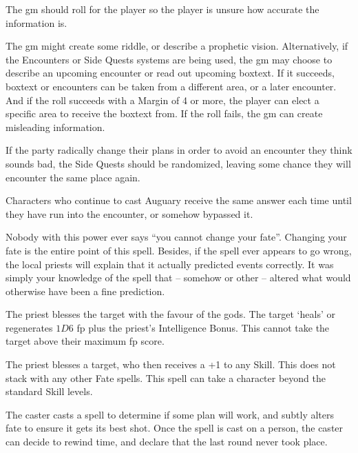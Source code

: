 \begin{multicols}{2}
The \gls{gm} should roll for the player so the player is unsure how accurate the information is.

The \gls{gm} might create some riddle, or describe a prophetic vision.
Alternatively, if the Encounters or Side Quests systems are being used, the \gls{gm} may choose to describe an upcoming encounter or read out upcoming boxtext.\iftoggle{verbose}{\footnote{See page \pageref{encounters}.}}{}
If it succeeds, boxtext or encounters can be taken from a different area, or a later encounter.
And if the roll succeeds with a Margin of 4 or more, the player can elect a specific area to receive the boxtext from.
If the roll fails, the \gls{gm} can create misleading information.

If the party radically change their plans in order to avoid an encounter they think sounds bad, the Side Quests should be randomized, leaving some chance they will encounter the same place again.

Characters who continue to cast Auguary receive the same answer each time until they have run into the encounter, or somehow bypassed it.

Nobody with this power ever says ``you cannot change your fate''.  Changing your fate is the entire point of this spell.  Besides, if the spell ever appears to go wrong, the local priests will explain that it actually predicted events correctly.  It was simply your knowledge of the spell that -- somehow or other -- altered what would otherwise have been a fine prediction.


The priest blesses the target with the favour of the gods. The target `heals' or regenerates $1D6$ \gls{fp} plus the priest's Intelligence Bonus. This cannot take the target above their maximum \gls{fp} score.

\spelllevel


The priest blesses a target, who then receives a +1 to any Skill.
This does not stack with any other Fate spells.
This spell can take a character beyond the standard Skill levels.


The caster casts a spell to determine if some plan will work, and subtly alters fate to ensure it gets its best shot.
Once the spell is cast on a person, the caster can decide to rewind time, and declare that the last round never took place.


\end{multicols}
